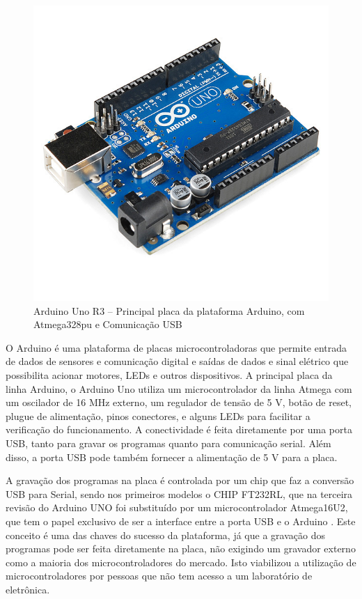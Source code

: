 \begin{figure}[H]
\centering
\includegraphics[width=\textwidth]{Figuras/arduino}
\caption{Arduino Uno R3 – Principal placa da plataforma Arduino, com Atmega328pu e Comunicação USB}
\label{fig:arduino}
\end{figure}

O Arduino é uma plataforma de placas microcontroladoras que permite entrada de dados de sensores e comunicação digital e saídas de dados e sinal elétrico que possibilita acionar motores, LEDs e outros dispositivos. A principal placa da linha Arduino, o Arduino Uno utiliza um microcontrolador  da linha Atmega com um oscilador de 16 MHz externo, um regulador de tensão de 5 V, botão de reset, plugue de alimentação, pinos conectores, e alguns LEDs para facilitar a verificação do funcionamento. A conectividade é feita diretamente por uma porta USB, tanto para gravar os programas quanto para comunicação serial. Além disso, a porta USB pode também fornecer a alimentação de 5 V para a placa.

A gravação dos programas na placa é controlada por um chip que faz a conversão USB para Serial, sendo nos primeiros modelos o CHIP FT232RL, que na terceira revisão do Arduino UNO foi substituído por um microcontrolador Atmega16U2, que tem o papel exclusivo de ser a interface entre a porta USB e o Arduino \citep{arduino-testes}. Este conceito é uma das chaves do sucesso da plataforma, já que a gravação dos programas pode ser feita diretamente na placa, não exigindo um gravador externo como a maioria dos microcontroladores do mercado. Isto viabilizou a utilização de microcontroladores por pessoas que não tem acesso a um laboratório de eletrônica.

